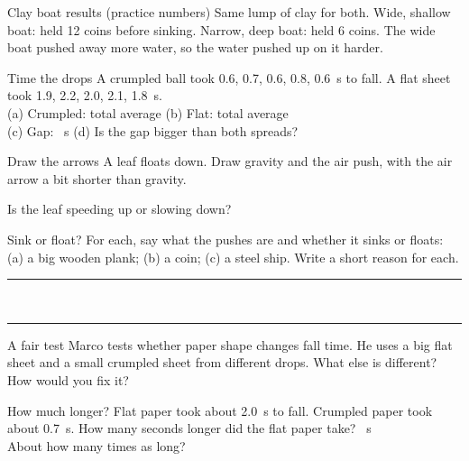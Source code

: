 \begin{worked}{Clay boat results (practice numbers)}
Same lump of clay for both. Wide, shallow boat: held 12 coins before sinking. Narrow, deep boat: held 6 coins. The wide boat pushed away more water, so the water pushed up on it harder.
\end{worked}

\begin{puzzle}{Time the drops}
A crumpled ball took 0.6, 0.7, 0.6, 0.8, 0.6~s to fall. A flat sheet took 1.9, 2.2, 2.0, 2.1, 1.8~s.\\
(a) Crumpled: total \wline[1.3cm] average \wline[1.3cm] \quad (b) Flat: total \wline[1.3cm] average \wline[1.3cm]\\
(c) Gap: \wline[1.3cm]~s \quad (d) Is the gap bigger than both spreads? \wline[1.6cm]
\end{puzzle}

\begin{puzzle}{Draw the arrows}
A leaf floats down. Draw gravity and the air push, with the air arrow a bit shorter than gravity.
\begin{center}
\end{center}
Is the leaf speeding up or slowing down? \wline[3cm]
\end{puzzle}

\begin{puzzle}{Sink or float?}
For each, say what the pushes are and whether it sinks or floats: (a) a big wooden plank; (b) a coin; (c) a steel ship. Write a short reason for each.\\
\rule{\linewidth}{0.5pt}\\[4pt]\rule{\linewidth}{0.5pt}
\end{puzzle}

\begin{puzzle}{A fair test}
Marco tests whether paper shape changes fall time. He uses a big flat sheet and a small crumpled sheet from different drops. What else is different? \wline[4cm]\\
How would you fix it? \wline[4cm]
\end{puzzle}
\clearpage

\begin{puzzle}{How much longer?}
Flat paper took about 2.0~s to fall. Crumpled paper took about 0.7~s. How many seconds longer did the flat paper take? \wline[2cm]~s\\
About how many times as long? \wline[2cm]
\end{puzzle}

